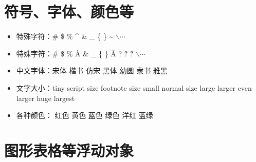 \section{符号、字体、颜色等}
\begin{itemize}
\item 特殊字符：\# \$ \% \^{} \& \_ \{ \} \~{} $\backslash \cdots$

\item 特殊字符：\# \$ \% \^{A} \& \_ \{ \} \~{A} ? \^{?} \~{?} $\backslash \cdots$

\item 中文字体：{\songti 宋体} {\kaishu 楷书} {\fangsong 仿宋} {\heiti 黑体} {\youyuan 幼圆} {\lishu 隶书} {\yahei 雅黑}

\item 文字大小：{\tiny tiny} {\scriptsize script size} {\footnotesize footnote size} {\small small} {\normalsize normal size} {\large large} {\Large larger} {\LARGE even larger} {\huge huge} {\Huge largest}

\item 各种颜色：{\color{red} 红色} {\color{yellow} 黄色} {\color{blue} 蓝色} {\color{green} 绿色} {\color{magenta}  洋红} {\color{cyan} 蓝绿}
\end{itemize}



\section{图形表格等浮动对象}

